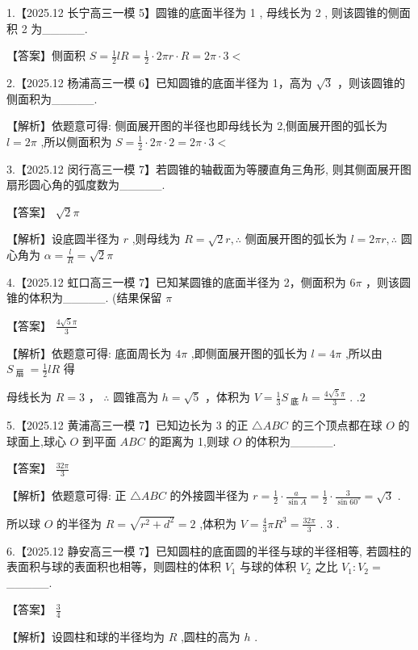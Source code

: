 \documentclass[10pt]{article}
\begin{document}
1.【2025.12 长宁高三一模 5】圆锥的底面半径为 1 , 母线长为 2 , 则该圆锥的侧面积 2 为\_\_\_\_\_.

【答案】侧面积 \(S = \frac{1}{2}{lR} = \frac{1}{2} \cdot  {2\pi r} \cdot  R = {2\pi } \cdot  3 <\)

2.【2025.12 杨浦高三一模 6】已知圆锥的底面半径为 1，高为 \(\sqrt{3}\) ，则该圆锥的侧面积为\_\_\_\_\_.

【解析】依题意可得: 侧面展开图的半径也即母线长为 2,侧面展开图的弧长为 \(l = {2\pi }\) ,所以侧面积为 \(S = \frac{1}{2} \cdot  {2\pi } \cdot  2 = {2\pi } \cdot  3 <\)

3.【2025.12 闵行高三一模 7】若圆锥的轴截面为等腰直角三角形, 则其侧面展开图扇形圆心角的弧度数为\_\_\_\_\_.

【答案】 \(\sqrt{2}\pi\)

【解析】设底圆半径为 \(r\) ,则母线为 \(R = \sqrt{2}r,\therefore\) 侧面展开图的弧长为 \(l = {2\pi r},\therefore\) 圆心角为 \(\alpha  = \frac{l}{R} = \sqrt{2}\pi\)

4.【2025.12 虹口高三一模 7】已知某圆锥的底面半径为 2，侧面积为 \({6\pi }\) ，则该圆锥的体积为\_\_\_\_\_. (结果保留 \(\pi\)

【答案】 \(\frac{4\sqrt{5}\pi }{3}\)

【解析】依题意可得: 底面周长为 \({4\pi }\) ,即侧面展开图的弧长为 \(l = {4\pi }\) ,所以由 \({S}_{\text{ 扇 }} = \frac{1}{2}{lR}\) 得

母线长为 \(R = 3\) ， \(\therefore\) 圆锥高为 \(h = \sqrt{5}\) ，体积为 \(V = \frac{1}{3}{S}_{\text{ 底 }}h = \frac{4\sqrt{5}\pi }{3}\) . .2

5.【2025.12 黄浦高三一模 7】已知边长为 3 的正 \(\bigtriangleup {ABC}\) 的三个顶点都在球 \(O\) 的球面上,球心 \(O\) 到平面 \({ABC}\) 的距离为 1,则球 \(O\) 的体积为\_\_\_\_\_.

【答案】 \(\frac{32\pi }{3}\)

【解析】依题意可得: 正 \(\bigtriangleup {ABC}\) 的外接圆半径为 \(r = \frac{1}{2} \cdot  \frac{a}{\sin A} = \frac{1}{2} \cdot  \frac{3}{\sin {60}^{ \circ  }} = \sqrt{3}\) .

所以球 \(O\) 的半径为 \(R = \sqrt{{r}^{2} + {d}^{2}} = 2\) ,体积为 \(V = \frac{4}{3}\pi {R}^{3} = \frac{32\pi }{3}\) . 3 .

6.【2025.12 静安高三一模 7】已知圆柱的底面圆的半径与球的半径相等, 若圆柱的表面积与球的表面积也相等，则圆柱的体积 \({V}_{1}\) 与球的体积 \({V}_{2}\) 之比 \({V}_{1} : {V}_{2} =\) \_\_\_\_\_.

【答案】 \(\frac{3}{4}\)

【解析】设圆柱和球的半径均为 \(R\) ,圆柱的高为 \(h\) .
\end{document}
